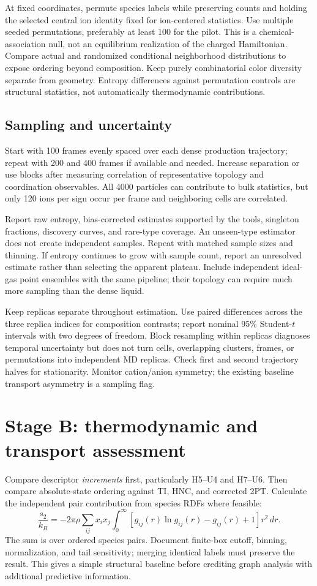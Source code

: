 \documentclass[11pt,a4paper]{article}
\begin{document}
At fixed coordinates, permute species labels while preserving counts and
holding the selected central ion identity fixed for ion-centered statistics.
Use multiple seeded permutations, preferably at least 100 for the pilot.
This is a chemical-association null, not an equilibrium realization of the
charged Hamiltonian. Compare actual and randomized conditional neighborhood
distributions to expose ordering beyond composition. Keep purely combinatorial
color diversity separate from geometry. Entropy differences against permutation
controls are structural statistics, not automatically thermodynamic contributions.

\subsection{Sampling and uncertainty}
Start with 100 frames evenly spaced over each dense production trajectory;
repeat with 200 and 400 frames if available and needed. Increase separation
or use blocks after measuring correlation of representative topology and
coordination observables. All 4000 particles can contribute to bulk statistics,
but only 120 ions per sign occur per frame and neighboring cells are correlated.

Report raw entropy, bias-corrected estimates supported by the tools, singleton
fractions, discovery curves, and rare-type coverage. An unseen-type estimator
does not create independent samples. Repeat with matched sample sizes and
thinning. If entropy continues to grow with sample count, report an unresolved
estimate rather than selecting the apparent plateau. Include independent
ideal-gas point ensembles with the same pipeline; their topology can require
much more sampling than the dense liquid.

Keep replicas separate throughout estimation. Use paired differences across
the three replica indices for composition contrasts; report nominal 95\%
Student-$t$ intervals with two degrees of freedom. Block resampling within
replicas diagnoses temporal uncertainty but does not turn cells, overlapping
clusters, frames, or permutations into independent MD replicas. Check first
and second trajectory halves for stationarity. Monitor cation/anion symmetry;
the existing baseline transport asymmetry is a sampling flag.

\section{Stage B: thermodynamic and transport assessment}
Compare descriptor \emph{increments} first, particularly H5--U4 and H7--U6.
Then compare absolute-state ordering against TI, HNC, and corrected 2PT.
Calculate the independent pair contribution from species RDFs where feasible:
\begin{equation}
\frac{s_2}{k_B}=-2\pi\rho\sum_{ij}x_ix_j
\int_0^\infty [g_{ij}(r)\ln g_{ij}(r)-g_{ij}(r)+1]r^2\,dr.
\end{equation}
The sum is over ordered species pairs. Document finite-box cutoff, binning,
normalization, and tail sensitivity; merging identical labels must preserve
the result. This gives a simple structural baseline before crediting graph
analysis with additional predictive information.
\end{document}
